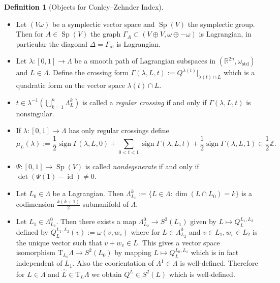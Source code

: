 \documentclass[a4paper]{article}
\newcommand{\RR}{\mathbb{R}}
\newcommand{\ZZ}{\mathbb{Z}}
\newcommand{\lra}{\longrightarrow}
\newcommand{\id}{\operatorname{id}}
\newcommand{\ts}{\mathrm{T}}
\theoremstyle{definition}
\theoremstyle{definition}
\newtheorem{definition}{Definition}
\theoremstyle{remark}
\theoremstyle{remark}
\theoremstyle{remark}
\begin{document}
\begin{definition}[Objects for Conley--Zehnder Index]
  \begin{itemize}
    \item Let $(V\omega)$ be a symplectic vector space and $\operatorname{Sp}(V)$ the symplectic group. Then for $A\in\operatorname{Sp}(V)$ the graph $\Gamma_A\subset (V\oplus V,\omega\oplus -\omega)$ is Lagrangian, in particular the diagonal $\Delta=\Gamma_{\id}$ is Lagrangian.
    \item Let $\lambda:[0,1]\lra\Lambda$ be a smooth path of Lagrangian subspaces in $(\RR^{2n},\omega_{\text{std}})$ and $L\in\Lambda$. Define the crossing form $\Gamma(\lambda,L,t):=Q^{\dot{\lambda}(t)}|_{\lambda(t)\cap L}$ which is a quadratic form on the vector space $\lambda(t)\cap L$.
    \item $t\in\lambda^{-1}(\bigcup_{k=1}^n\Lambda_L^k)$ is called a \emph{regular crossing} if and only if $\Gamma(\lambda,L,t)$ is nonsingular.
    \item If $\lambda:[0,1]\lra\Lambda$ has only regular crossings define
      \begin{equation*}
        \mu_L(\lambda):=\frac{1}{2}\operatorname{sign} \Gamma(\lambda,L,0)+\sum_{0<t<1}\operatorname{sign}\Gamma(\lambda,L,t)+\frac{1}{2}\operatorname{sign}\Gamma(\lambda,L,1)\in\frac{1}{2}\ZZ.
      \end{equation*}
    \item $\Psi:[0,1]\lra\operatorname{Sp}(V)$ is called \emph{nondegenerate} if and only if $\det(\Psi(1)-\id)\neq 0$.
    \item Let $L_0\in\Lambda$ be a Lagrangian. Then $\Lambda_{L_0}^k:=\{L\in\Lambda:\dim(L\cap L_0)=k\}$ is a codimension $\frac{k(k+1)}{2}$ submanifold of $\Lambda$.
    \item Let $L_1\in\Lambda^0_{L_2}$. Then there exists a map $\Lambda_{L_2}^0\lra S^2(L_1)$ given by $L\longmapsto Q_L^{L_1,L_2}$ defined by $Q_L^{L_1,L_2}(v):=\omega(v,w_v)$ where for $L\in\Lambda^0_{L_2}$ and $v\in L_1, w_v\in L_2$ is the unique vector such that $v+w_v\in L$. This gives a vector space isomorphism $\ts_{L_0}\Lambda\lra S^2(L_0)$ by mapping $L\longmapsto Q_L^{L_0,L_1}$ which is in fact independent of $L_1$. Also the coorientation of $\Lambda^1\in\Lambda$ is well-defined. Therefore for $L\in\Lambda$ and $\widehat{L}\in\ts_L\Lambda$ we obtain $Q^{\widehat{L}}\in S^2(L)$ which is well-defined.
  \end{itemize}
\end{definition}
\end{document}
